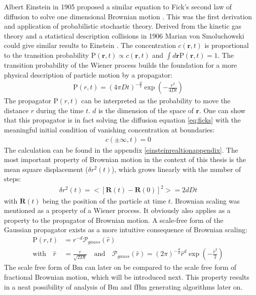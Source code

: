 \documentclass[
  a4paper,BCOR10mm,oneside,
  headsepline,footsepline,%
  fleqn,openbib
]{scrbook}
\begin{document}
Albert Einstein in 1905 proposed a similar equation to Fick's second law of diffusion to solve one dimensional Brownian motion \cite{Einstein1905}. This was the first derivation and application of probabilistic stochastic theory. Derived from the kinetic gas theory and a statistical description collisions in 1906 Marian von Smoluchowski could give similar results to Einstein \cite{vonSmoluchowski1906}. The concentration $c(\bm{r},t)$ is proportional to the transition probability $\mathrm{P}(\bm{r},t) \propto c(\bm{r},t)$ and  $\int d\bm{r}\mathrm{P}(\bm{r},t)=1$. The transition probability of the Wiener process builds the foundation for a more physical description of particle motion by a propagator:
\begin{align}
 \mathrm{P}(r,t)=  \left(4 \pi D t\right)^{- \frac{d}{2}} \exp \left(- \frac{r^2}{4 D t} \right) \label{propagator}
\end{align}
The propagator $\mathrm{P}(r,t)$ can be interpreted as the probability to move the distance $r$ during the time $t$. $d$ is the dimension of the space of $\bm{r}$. One can show that this propagator is in fact solving the diffusion equation \cref{eq:ficks} with the meaningful initial condition of vanishing concentration at boundaries: 
\begin{align}
c(\pm \infty,t)=0
\end{align}
The calculation can be found in the appendix \ref{einsteinrealtionappendix}. The most important property of Brownian motion in the context of this thesis  is the mean square displacement ($\delta r^2(t)$), which grows linearly with the number of steps: 
\begin{align}
\delta r^2(t)=<[\bm{R}(t)-\bm{R}(0)]^2>= 2dDt                                                                                                                                                                                                                                                                                                                                \end{align}
with $\bm{R}(t)$ being the position of the particle at time $t$.
Brownian scaling was mentioned as a property of a Wiener process. It obviously also applies as a property to the propagator of Brownian motion. A scale-free form of the Gaussian propagator exists as a more intuitive consequence of Brownian scaling: 
\begin{align}
\mathrm{P}(r,t)&= r^{-d} \mathcal{P}_{gauss}(\hat{r}) \\ \text{with} \quad \hat{r} &= \frac{r}{\sqrt{2Dt}} \quad \text{and} \quad \mathcal{P}_{gauss}(\hat{r})= (2 \pi)^{- \frac{d}{2}}  \hat{r}^d \exp \left(- \frac{\hat{r}^2}{2} \right) \label{scalefreeform} 
\end{align}
The scale free form of Bm can later on be compared to the scale free form of fractional Brownian motion, which will be introduced next. This property results in a neat possibility of analysis of Bm and fBm generating algorithms later on.
\end{document}

